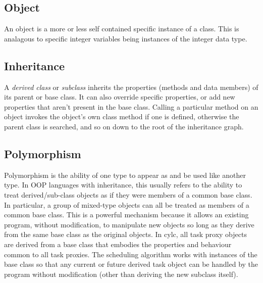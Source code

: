 \documentclass[11pt,a4paper]{article}
\begin{document}
\subsection{Object}

An object is a more or less self contained specific instance
of a class. This is analagous to specific integer variables being 
instances of the integer data type.

\subsection{Inheritance}

A {\em derived class} or {\em subclass} inherits the properties (methods
and data members) of its parent or base class. It can also override
specific properties, or add new properties that aren't present in the
base class. Calling a particular method on an object invokes the
object's own class method if one is defined, otherwise the parent
class is searched, and so on down to the root of the inheritance
graph. 



\subsection{Polymorphism}

Polymorphism is the ability of one type to appear as and be used like
another type.  In OOP languages with inheritance, this usually refers to
the ability to treat derived/sub-class objects as if they were members
of a common base class. In particular, a group of mixed-type objects
can all be treated as members of a common base class. 
This is a powerful mechanism because it allows an existing program,
without modification, to manipulate new objects so long as they 
derive from the same base class as the original objects.
In cylc, all task proxy objects are derived from a base class that 
embodies the properties and behaviour common to all task proxies. 
The scheduling algorithm works with instances of the base class so that
any current or future derived task object can be handled by the program
without modification (other than deriving the new subclass itself).
\end{document}
